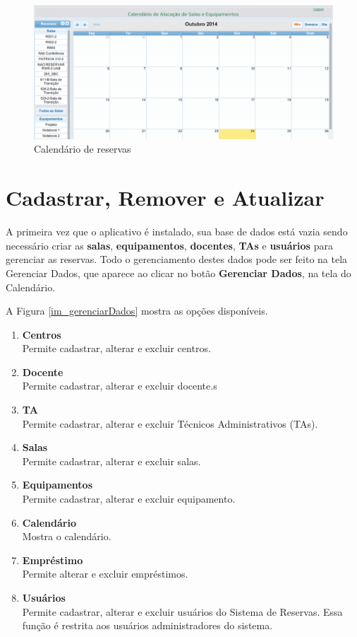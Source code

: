 \documentclass[openany,10pt,a4paper]{book}
\begin{document}
 \begin{figure}[!htb]
     \centering
     \includegraphics[scale=0.3]{calendario.png}
     \caption{Calendário de reservas}
     \label{im_calendario}
 \end{figure}




\section{Cadastrar, Remover e Atualizar}

A primeira vez que o aplicativo é instalado, sua base de dados está vazia sendo necessário criar as \textbf{salas}, \textbf{equipamentos}, \textbf{docentes}, \textbf{TAs} e \textbf{usuários} para gerenciar as reservas.
Todo o gerenciamento destes dados pode ser feito na tela Gerenciar Dados, que aparece ao clicar no botão \textbf{Gerenciar Dados}, na tela do Calendário.

A Figura \ref{im_gerenciarDados} mostra as opções disponíveis.

\begin{enumerate}
\item{\textbf{Centros}}\\
Permite cadastrar, alterar e excluir centros.
\item{\textbf{Docente}}\\
Permite cadastrar, alterar e excluir docente.s
\item{\textbf{TA}}\\
Permite cadastrar, alterar e excluir Técnicos Administrativos (TAs).
\item{\textbf{Salas}}\\
Permite cadastrar, alterar e excluir salas.
\item{\textbf{Equipamentos}}\\
Permite cadastrar, alterar e excluir equipamento.
\item{\textbf{Calendário}}\\
Mostra o calendário.
\item{\textbf{Empréstimo}}\\
Permite alterar e excluir empréstimos.
\item{\textbf{Usuários}}\\
Permite cadastrar, alterar e excluir usuários do Sistema de Reservas. Essa função é restrita aos usuários administradores do sistema. 
\end{enumerate}
\end{document}
